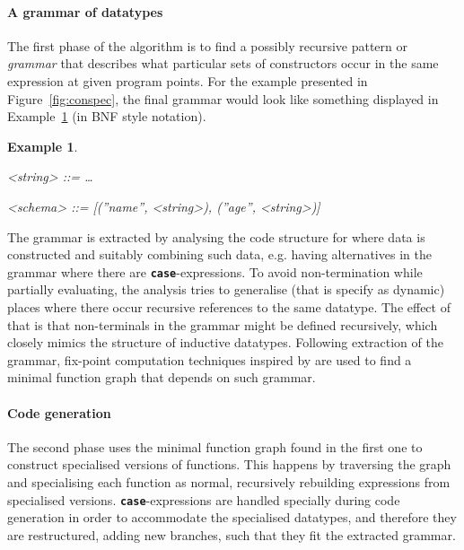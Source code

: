 \documentclass{ituthesis}
\theoremstyle{break}
\newtheorem{exmp}{Example}
\begin{document}
\paragraph{A grammar of datatypes}
\label{par:Findingaminimalgrammar}
The first phase of the algorithm is to find a possibly recursive pattern or \textit{grammar} that describes what particular sets of constructors occur in the same expression
at given program points. For the example presented in Figure~\ref{fig:conspec}, the final grammar would look like something displayed in Example~\ref{exmp:grammarspec} (in BNF style notation).

\setlength{\grammarparsep}{12pt plus 1pt minus 1pt} %
\setlength{\grammarindent}{12em}
\begin{exmp}
  \begin{grammar}
    <string> ::= \ldots

    <schema> ::= [(''name'', <string>), (''age'', <string>)]
  \end{grammar}
  \label{exmp:grammarspec}
\end{exmp}

The grammar is extracted by analysing the code structure for where data is constructed and suitably combining such data, e.g. having alternatives in the grammar where there are \texttt{\textbf{case}}-expressions.
To avoid non-termination while partially evaluating, the analysis tries to generalise (that is specify as dynamic) places where there occur recursive references to the same datatype.
The effect of that is that non-terminals in the grammar might be defined recursively, which closely mimics the structure of inductive datatypes.
Following extraction of the grammar, fix-point computation techniques inspired by \textcite{Jones:1986:DFA:512644.512672} are used to find a minimal function graph that depends on such grammar.

\paragraph{Code generation}
\label{par:Code generation}
The second phase uses the minimal function graph found in the first one to construct specialised versions of functions.
This happens by traversing the graph and specialising each function as normal, recursively rebuilding expressions from specialised versions.
\texttt{\textbf{case}}-expressions are handled specially during code generation in order to accommodate the specialised datatypes, and therefore they are restructured, adding new branches, such that they fit the extracted grammar.
\end{document}
